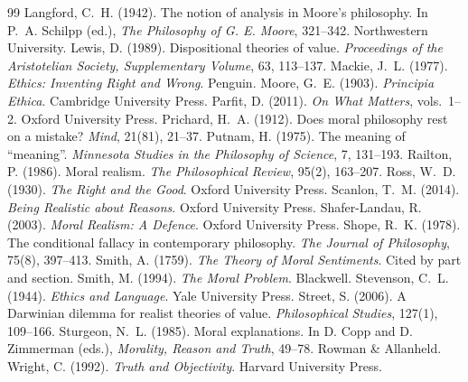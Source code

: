 \documentclass{situationist-preprint}
\begin{document}
\begin{thebibliography}{99}
 Langford, C.~H. (1942). The notion of analysis in Moore's philosophy. In P.~A. Schilpp (ed.), \emph{The Philosophy of G. E. Moore}, 321--342. Northwestern University.
 Lewis, D. (1989). Dispositional theories of value. \emph{Proceedings of the Aristotelian Society, Supplementary Volume}, 63, 113--137.
 Mackie, J.~L. (1977). \emph{Ethics: Inventing Right and Wrong}. Penguin.
 Moore, G.~E. (1903). \emph{Principia Ethica}. Cambridge University Press.
 Parfit, D. (2011). \emph{On What Matters}, vols.~1--2. Oxford University Press.
 Prichard, H.~A. (1912). Does moral philosophy rest on a mistake? \emph{Mind}, 21(81), 21--37.
 Putnam, H. (1975). The meaning of \enquote{meaning}. \emph{Minnesota Studies in the Philosophy of Science}, 7, 131--193.
 Railton, P. (1986). Moral realism. \emph{The Philosophical Review}, 95(2), 163--207.
 Ross, W.~D. (1930). \emph{The Right and the Good}. Oxford University Press.
 Scanlon, T.~M. (2014). \emph{Being Realistic about Reasons}. Oxford University Press.
 Shafer-Landau, R. (2003). \emph{Moral Realism: A Defence}. Oxford University Press.
 Shope, R.~K. (1978). The conditional fallacy in contemporary philosophy. \emph{The Journal of Philosophy}, 75(8), 397--413.
 Smith, A. (1759). \emph{The Theory of Moral Sentiments}. Cited by part and section.
 Smith, M. (1994). \emph{The Moral Problem}. Blackwell.
 Stevenson, C.~L. (1944). \emph{Ethics and Language}. Yale University Press.
 Street, S. (2006). A Darwinian dilemma for realist theories of value. \emph{Philosophical Studies}, 127(1), 109--166.
 Sturgeon, N.~L. (1985). Moral explanations. In D. Copp and D. Zimmerman (eds.), \emph{Morality, Reason and Truth}, 49--78. Rowman \& Allanheld.
 Wright, C. (1992). \emph{Truth and Objectivity}. Harvard University Press.
\end{thebibliography}
\end{document}
